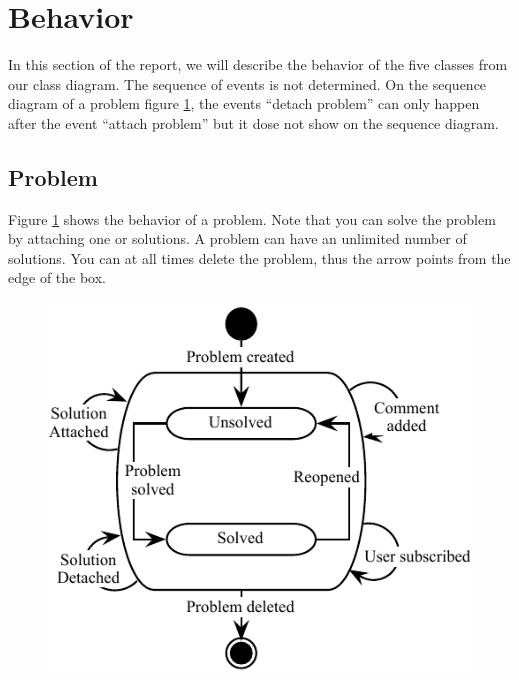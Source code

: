  \section{Behavior}
In this section of the report, we will describe the behavior of the five classes from our class diagram. The sequence of events is not determined. On the sequence diagram of a problem figure \ref{fig:Klasse_diagram_problem}, the events ``detach problem'' can only happen after the event ``attach problem'' but it dose not show on the sequence diagram.      


\subsection{Problem}
\label{sub:problem}
Figure \ref{fig:Klasse_diagram_problem} shows the behavior of a problem. Note that you can solve the problem by attaching one or solutions. A problem can have an unlimited number of solutions. You can at all times delete the problem, thus the arrow points from the edge of the box.
\begin{figure}[H]
\begin{center}
\includegraphics[scale=1]{input/problem_domain_analysis/Klassediagram_problem.pdf}
\label{fig:Klasse_diagram_problem}
\end{center}
\end{figure}


